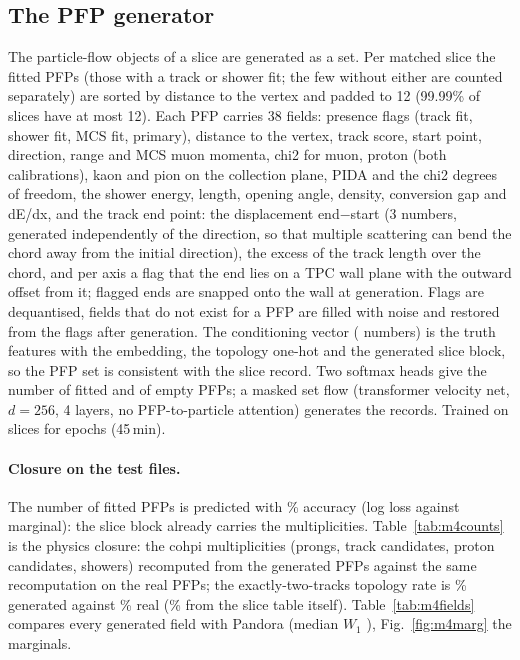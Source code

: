 \documentclass[11pt]{article}
\newcommand{\real}{Pandora}
\begin{document}
\subsection{The PFP generator}
\label{sec:m4}

The particle-flow objects of a slice are generated as a set. Per matched slice the fitted PFPs (those with a
track or shower fit; the few without either are counted separately) are sorted by distance to the vertex and
padded to 12 (99.99\% of slices have at most 12). Each PFP carries 38 fields: presence flags (track fit, shower
fit, MCS fit, primary), distance to the vertex, track score, start point, direction, range and MCS muon momenta,
chi2 for muon, proton (both calibrations), kaon and pion on the collection plane, PIDA and the chi2 degrees of
freedom, the shower energy, length, opening angle, density, conversion gap and dE/dx, and the track end point:
the displacement end$-$start (3 numbers, generated independently of the direction, so that multiple scattering
can bend the chord away from the initial direction), the excess of the track length over the chord, and per axis
a flag that the end lies on a TPC wall plane with the outward offset from it; flagged ends are snapped onto the
wall at generation. Flags are dequantised, fields that do not exist for a PFP are filled with noise and restored
from the flags after generation. The conditioning vector (\mFourCond{} numbers) is the truth features with the
embedding, the topology one-hot and the generated slice block, so the PFP set is consistent with the slice
record. Two softmax heads give the number of fitted and of empty PFPs; a masked set flow (transformer velocity
net, $d=256$, 4 layers, no PFP-to-particle attention) generates the records. Trained on \mFourN{} slices for
\mFourEpochs{} epochs (45\,min).

\paragraph{Closure on the test files.} The number of fitted PFPs is predicted with \mFourNfitAcc\% accuracy (log
loss \mFourNfitLL{} against \mFourNfitLLm{} marginal): the slice block already carries the multiplicities.
Table~\ref{tab:m4counts} is the physics closure: the cohpi multiplicities (prongs, track candidates, proton
candidates, showers) recomputed from the generated PFPs against the same recomputation on the real PFPs; the
exactly-two-tracks topology rate is \mFourTwoGen\% generated against \mFourTwoReal\% real (\mFourTwoSlc\% from
the slice table itself). Table~\ref{tab:m4fields} compares every generated field with \real{} (median $W_1$
\mFourWmed), Fig.~\ref{fig:m4marg} the marginals.
\end{document}
